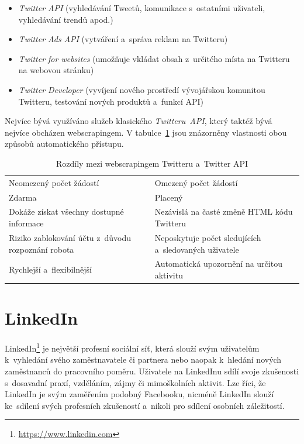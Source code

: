 \begin{itemize}
    \item \textit{Twitter API} (vyhledávání Tweetů, komunikace s~ostatními uživateli, vyhledávání trendů apod.)
    \item \textit{Twitter Ads API} (vytváření a~správa reklam na Twitteru)
    \item \textit{Twitter for websites} (umožňuje vkládat obsah z~určitého místa na Twitteru na webovou stránku)
    \item \textit{Twitter Developer} (vyvíjení nového prostředí vývojářskou komunitou Twitteru, testování nových produktů a~funkcí API)
\end{itemize}

\noindent
Nejvíce bývá využíváno služeb klasického \textit{Twitteru~API}, který taktéž bývá nejvíce obcházen webscrapingem. V tabulce~\ref{tab:Twitter_API_vs_webscraping} jsou znázorněny vlastnosti obou způsobů automatického přístupu.

\begin{table}[H]
\begin{tabularx}{\linewidth}{
    |>{\hsize=1\hsize}X|>{\hsize=1\hsize}X|
  }
\hline

\multicolumn{1}{|c|}{\textbf{Webscraping}} & \multicolumn{1}{|c|}{\textbf{Twitter API}} \\
\hline
Neomezený počet žádostí & Omezený počet žádostí \\
\hline
Zdarma & Placený \\
\hline
Dokáže získat všechny dostupné informace & Nezávislá na časté změně HTML kódu Twitteru \\
\hline
Riziko zablokování účtu z~důvodu rozpoznání robota & Neposkytuje počet sledujících a~sledovaných uživatele \cite{bib:Twitter_followings}\\ \hline
Rychlejší a~flexibilnější \cite{bib:Twitter_followings} & Automatická upozornění na určitou aktivitu \\
\hline
\end{tabularx}

\label{tab:Twitter_API_vs_webscraping}
\caption{Rozdíly mezi webscrapingem Twitteru a~Twitter API}
\end{table}

\section{LinkedIn}
LinkedIn\footnote{\href{https://www.linkedin.com}{https://www.linkedin.com}} je největší profesní sociální síť, která slouží svým uživatelům k~vyhledání svého zaměstnavatele či partnera nebo naopak k~hledání nových zaměstnanců do pracovního poměru. Uživatele na LinkedInu sdílí svoje zkušenosti s~dosavadní praxí, vzděláním, zájmy či mimoškolních aktivit. Lze říci, že LinkedIn je svým zaměřením podobný Facebooku, nicméně LinkedIn slouží ke~sdílení svých profesních zkušeností a~nikoli pro sdílení osobních záležitostí. 

